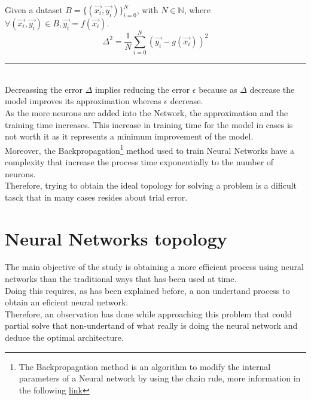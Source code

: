 \documentclass[a4paper, 11pt]{article}
\begin{document}
Given a dataset $B = \{(\vec{x_i},\vec{y_i})\}_{i=0}^{N}$, with $N \in \mathbb{N}$, where $\forall (\vec{x_i},\vec{y_i}) \in B, \vec{y_i} = f(\vec{x_i})$.
$$\Delta^2 = \frac{1}{N} \sum_{i=0}^{N} \left( \vec{y_i} - g(\vec{x_i}) \right)^2$$
\rule{\linewidth}{0.4pt}\\\vspace{0.5em}
Decreassing the error $\Delta$ implies reducing the error $\epsilon$ because as $\Delta$ decrease the model improves its approximation whereas $\epsilon$ decrease.\\
As the more neurons are added into the Network, the approximation and the training time increases. This increase in training time for the model in cases is not worth it as it represents a minimum improvement of the model.\\
Moreover, the Backpropagation\footnote{The Backpropagation method is an algorithm to modify the internal parameters of a Neural network by using the chain rule, more information in the following \href{https://en.wikipedia.org/wiki/Backpropagation}{link}} method used to train Neural Networks have a complexity that increase the process time exponentially to the number of neurons.\\
Therefore, trying to obtain the ideal topology for solving a problem is a dificult tasck that in many cases resides about trial error.
\section{Neural Networks topology}
The main objective of the study is obtaining a more efficient process using neural networks than the traditional ways that has been used at time.\\
Doing this requires, as has been explained before, a non undertand process to obtain an eficient neural network.\\
Therefore, an observation has done while approaching this problem that could partial solve that non-undertand of what really is doing the neural network and deduce the optimal architecture. 
\end{document}
